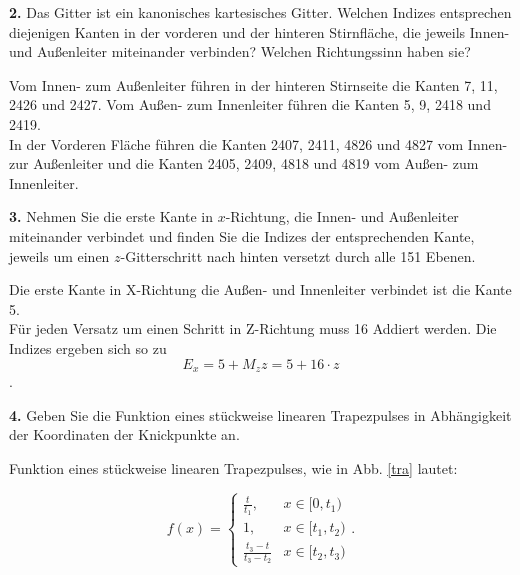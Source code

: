 \documentclass[Protokollheft.tex]{subfiles}
\begin{document}
\begin{framed}
	\noindent \textbf{2.} Das Gitter ist ein kanonisches kartesisches Gitter. Welchen
Indizes entsprechen diejenigen Kanten in der vorderen und der hinteren
Stirnfläche, die jeweils Innen- und Außenleiter miteinander
verbinden? Welchen Richtungssinn haben sie?\label{exer:idxConductorInterconnection}
\end{framed}

Vom Innen- zum Außenleiter führen in der hinteren Stirnseite die Kanten 7, 11, 2426 und 2427. Vom Außen- zum Innenleiter führen die Kanten 5, 9, 2418 und 2419. \\
In der Vorderen Fläche führen die Kanten 2407, 2411, 4826 und 4827 vom Innen- zur Außenleiter
und die Kanten 2405, 2409, 4818 und 4819 vom Außen- zum Innenleiter. 
\begin{framed}
	\noindent \textbf{3.} Nehmen Sie die erste Kante in $x$-Richtung, die Innen- und Außenleiter
miteinander verbindet und finden Sie die Indizes der
entsprechenden Kante, jeweils um einen $z$-Gitterschritt nach
hinten versetzt durch alle 151 Ebenen.\label{exer:idxEdge4allZ}
\end{framed}

Die erste Kante in X-Richtung die Außen- und Innenleiter verbindet ist die Kante 5. \\
Für jeden Versatz um einen Schritt in Z-Richtung muss 16 Addiert werden. Die Indizes ergeben sich so zu 
\begin{equation}
	E_x = 5+M_zz = 5 + 16\cdot z
\end{equation}
.
\begin{framed}
	\noindent \textbf{4.} Geben Sie die Funktion eines stückweise linearen
Trapezpulses in Abhängigkeit der Koordinaten der Knickpunkte an.\label{exer:calcPiecewiseTrapezoidal}
\end{framed}

Funktion eines stückweise linearen Trapezpulses, wie in Abb. \ref{tra}  lautet:

$$
f(x)=\left\{
\begin{array}{ll} \frac{t}{t_1}, & x\in [0,t_1) \\
1, & x\in [t_1,t_2) \\
\frac{t_3-t}{t_3-t_2} & x\in [t_2,t_3)

\end{array}\right. .
$$
\end{document}

